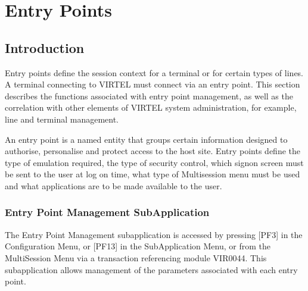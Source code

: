 \documentclass[letterpaper,10pt,english]{sphinxmanual}
\begin{document}
\ignorespaces 

\chapter{Entry Points}
\label{\detokenize{connectivity_guide:entry-points}}\label{\detokenize{connectivity_guide:index-105}}

\section{Introduction}
\label{\detokenize{connectivity_guide:id56}}
\sphinxAtStartPar
Entry points define the session context for a terminal or for certain types of lines. A terminal connecting to VIRTEL must connect via an entry point. This section describes the functions associated with entry point management, as well as the correlation with other elements of VIRTEL system administration, for example, line and terminal management.

\sphinxAtStartPar
An entry point is a named entity that groups certain information designed to authorise, personalise and protect access to the host site. Entry points define the type of emulation required, the type of security control, which sign\sphinxhyphen{}on screen must be sent to the user at log on time, what type of Multi\sphinxhyphen{}session menu must be used and what applications are to be made available to the user.

\ignorespaces 

\subsection{Entry Point Management Sub\sphinxhyphen{}Application}
\label{\detokenize{connectivity_guide:entry-point-management-sub-application}}\label{\detokenize{connectivity_guide:index-106}}
\sphinxAtStartPar
The Entry Point Management sub\sphinxhyphen{}application is accessed by pressing {[}PF3{]} in the Configuration Menu, or {[}PF13{]} in the Sub\sphinxhyphen{}Application Menu, or from the Multi\sphinxhyphen{}Session Menu via a transaction referencing module VIR0044. This subapplication allows management of the parameters associated with each entry point.
\end{document}
